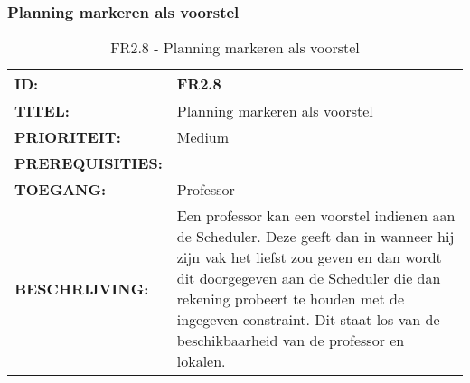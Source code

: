 \subsubsection{Planning markeren als voorstel}         
\noindent\begin{table}[H]
            \begin{tabular}{l | p{10cm}}
                \textbf{ID:} & FR2.8 \\ \hline
                \textbf{TITEL:} & Planning markeren als voorstel\\ \hline
                \textbf{PRIORITEIT:} &  Medium \\ \hline
                \textbf{PREREQUISITIES:} & \\ \hline
                \textbf{TOEGANG:} & Professor \\ \hline
                \textbf{BESCHRIJVING:} & Een professor kan een voorstel indienen aan de Scheduler. 
                                        Deze geeft dan in wanneer hij zijn vak het liefst zou geven en dan wordt dit doorgegeven aan de Scheduler die dan rekening probeert te houden met de ingegeven constraint. Dit staat los van de beschikbaarheid van de professor en lokalen.  \\
            \end{tabular}\\
            \caption{FR2.8 - Planning markeren als voorstel}
            \label{tab:FR2.8 - Planning markeren als voorstel}
        \end{table}
        
